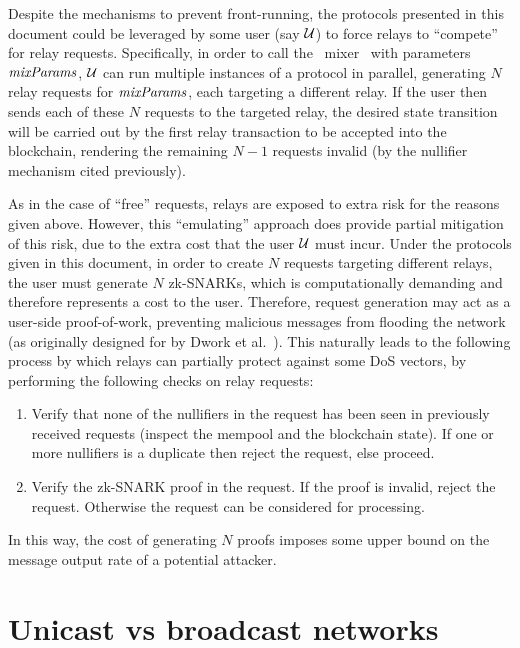 Despite the mechanisms to prevent front-running, the protocols presented in this document could be leveraged by some user (say $\mathcal{U}$) to force relays to ``compete'' for relay requests.
Specifically, in order to call the \zeth~mixer \mixer~with parameters $\mathit{mixParams}$, $\mathcal{U}$ can run multiple instances of a protocol in parallel, generating $N$ relay requests for $\mathit{mixParams}$, each targeting a different relay. If the user then sends each of these $N$ requests to the targeted relay, the desired state transition will be carried out by the first relay transaction to be accepted into the blockchain, rendering the remaining $N-1$ requests invalid (by the nullifier mechanism cited previously).

As in the case of ``free'' requests, relays are exposed to extra risk for the reasons given above. However, this ``emulating'' approach does provide partial mitigation of this risk, due to the extra cost that the user $\mathcal{U}$ must incur. Under the protocols given in this document, in order to create $N$ requests targeting different relays, the user must generate $N$ zk-SNARKs, which is computationally demanding and therefore represents a cost to the user. Therefore, request generation may act as a user-side proof-of-work, preventing malicious messages from flooding the network (as originally designed for by Dwork et al.~\cite{DBLP:conf/crypto/DworkN92,Jakobsson1999ProofsOW}). This naturally leads to the following process by which relays can partially protect against some DoS vectors, by performing the following checks on relay requests:
\begin{enumerate}
    \item Verify that none of the nullifiers in the request has been seen in previously received requests (inspect the mempool and the blockchain state). If one or more nullifiers is a duplicate then reject the request, else proceed.
    \item Verify the zk-SNARK proof in the request. If the proof is invalid, reject the request. Otherwise the request can be considered for processing.
\end{enumerate}

In this way, the cost of generating $N$ proofs imposes some upper bound on the message output rate of a potential attacker.

\section{Unicast vs broadcast networks}\label{unicast-vs-broadcast:unicast-vs-broadcast}

